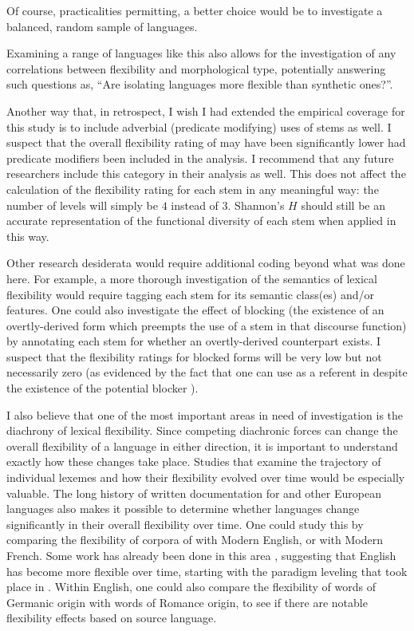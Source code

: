 \noindent Of course, practicalities permitting, a better choice would be to investigate a balanced, random sample of languages.

Examining a range of languages like this also allows for the investigation of any correlations between flexibility and morphological type, potentially answering such questions as, \enquote{Are isolating languages more flexible than synthetic ones?}. 

Another way that, in retrospect, I wish I had extended the empirical coverage for this study is to include adverbial (predicate modifying) uses of stems as well. I suspect that the overall flexibility rating of  may have been significantly lower had predicate modifiers been included in the analysis. I recommend that any future researchers include this category in their analysis as well. This does not affect the calculation of the flexibility rating for each stem in any meaningful way: the number of levels will simply be $4$ instead of $3$. Shannon's $H$ should still be an accurate representation of the functional diversity of each stem when applied in this way.

Other research desiderata would require additional coding beyond what was done here. For example, a more thorough investigation of the semantics of lexical flexibility would require tagging each stem for its semantic class(es) and/or features. One could also investigate the effect of blocking (the existence of an overtly-derived form which preempts the use of a stem in that discourse function) by annotating each stem for whether an overtly-derived counterpart exists. I suspect that the flexibility ratings for blocked forms will be very low but not necessarily zero (as evidenced by the fact that one can use  as a referent in  despite the existence of the potential blocker ).

I also believe that one of the most important areas in need of investigation is the diachrony of lexical flexibility. Since competing diachronic forces can change the overall flexibility of a language in either direction, it is important to understand exactly how these changes take place. Studies that examine the trajectory of individual lexemes and how their flexibility evolved over time would be especially valuable. The long history of written documentation for  and other European languages also makes it possible to determine whether languages change significantly in their overall flexibility over time. One could study this by comparing the flexibility of corpora of  with Modern English, or  with Modern French. Some work has already been done in this area \parencites[414]{Cannon1985}{Kastovsky1996}, suggesting that English has become more flexible over time, starting with the paradigm leveling that took place in . Within English, one could also compare the flexibility of words of Germanic origin with words of Romance origin, to see if there are notable flexibility effects based on source language.

